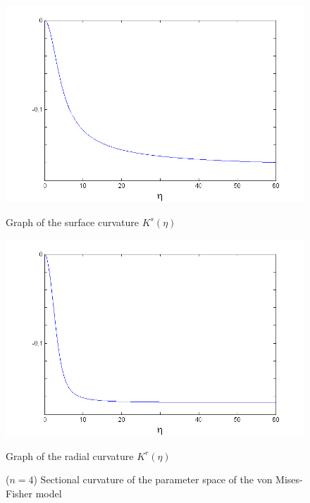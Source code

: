 \documentclass{svmult}
\begin{document}
\begin{figure} [!t] \label{fig2}
\centering
  \centering
  \includegraphics[width=0.9\linewidth]{Figures/n4ks1}
  \caption*{Graph of the surface curvature $K^s(\eta)$}
  \centering
  \includegraphics[width=0.9\linewidth]{Figures/n4kr1}
  \caption*{Graph of the radial curvature $K^r(\eta)$}
\caption{($n = 4$) Sectional curvature of the parameter space of the von Mises-Fisher model}
\label{fig2}
\end{figure}
\end{document}
